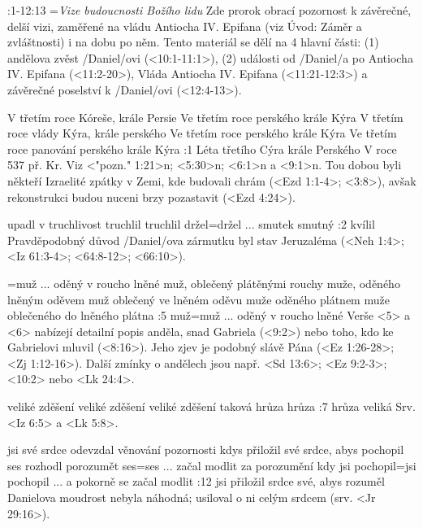 
:1-12:13 {}={\it Vize budoucnosti Božího lidu} Zde prorok obrací pozornost k  závěrečné, delší vizi, zaměřené na vládu Antiocha IV. Epifana (viz Úvod: Záměr a zvláštnosti) i na dobu po něm. Tento materiál se dělí na 4 hlavní části: (1) andělova zvěst \x/Daniel/ovi (<10:1-11:1>), (2) události od \x/Daniel/a po Antiocha IV. Epifana  (<11:2-20>), Vláda Antiocha IV. Epifana (<11:21-12:3>) a závěrečné poselství k \x/Daniel/ovi (<12:4-13>). 


    {V třetím roce Kóreše, krále Persie}   %
    {Ve třetím roce perského krále Kýra}   %
    {V třetím roce vlády Kýra, krále perského}   %
    {Ve třetím roce perského krále Kýra}   %
    {Ve třetím roce panování perského krále Kýra}   %
:1 {Léta třetího Cýra krále Perského} V roce 537 př. Kr. Viz <"pozn." 1:21>n; <5:30>n; <6:1>n a <9:1>n. Tou dobou byli někteří Izraelité  zpátky v Zemi, kde budovali chrám (<Ezd 1:1-4>; <3:8>), avšak rekonstrukci budou nuceni brzy pozastavit (<Ezd 4:24>).

 {upadl v truchlivost} {truchlil} {truchlil} {držel}={držel ... smutek} {smutný}
:2 {kvílil} Pravděpodobný důvod \x/Daniel/ova zármutku byl stav Jeruzaléma (<Neh 1:4>; <Iz 61:3-4>; <64:8-12>; <66:10>).

={muž ... oděný v roucho lněné} 
           {muž, oblečený plátěnými rouchy} 
           {muže, oděného lněným oděvem} 
           {muž oblečený ve lněném oděvu} 
           {muže oděného plátnem} 
           {muže oblečeného do lněného plátna}
:5 {muž}={muž ... oděný v roucho lněné} 
    Verše <5> a <6> nabízejí detailní popis anděla, snad Gabriela (<9:2>) nebo toho, kdo ke Gabrielovi mluvil (<8:16>). Jeho zjev je podobný slávě Pána (<Ez 1:26-28>; <Zj 1:12-16>). Další zmínky o andělech jsou např.  <Sd 13:6>; <Ez 9:2-3>; <10:2> nebo <Lk 24:4>.
    
    {veliké zděšení} %
    {veliké zděšení} %
    {veliké zděšení} %
    {taková hrůza}   %
    {hrůza}          %
:7 {hrůza veliká} Srv. <Iz 6:5> a <Lk 5:8>.

    {jsi své srdce odevzdal věnování pozornosti}   %
    {kdys přiložil své srdce, abys pochopil}   %
    {ses rozhodl porozumět}   %
    {ses}={ses ... začal modlit za porozumění}   %
    {kdy jsi pochopil}={jsi pochopil ... a pokorně se začal modlit}   %
:12 {jsi přiložil srdce své, abys rozuměl} Danielova moudrost nebyla náhodná; usiloval o ni celým srdcem (srv. <Jr 29:16>). 

